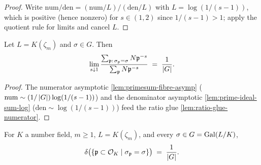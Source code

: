 \begin{proof}\leanok
  Write $\mathrm{num}/\mathrm{den} = (\mathrm{num}/L)/(\mathrm{den}/L)$
  with $L = \log(1/(s-1))$, which is positive (hence nonzero) for
  $s\in(1,2)$ since $1/(s-1) > 1$; apply the quotient rule for limits
  and cancel $L$.
\end{proof}

\begin{lemma}\label{lem:cyclotomic-density-two-sided}
  Let $L = K(\zeta_m)$ and $\sigma \in G$. Then
  \[
    \lim_{s\downarrow 1}
    \frac{\sum_{\mathfrak{p}:\,\sigma_{\mathfrak{p}} = \sigma} N\mathfrak{p}^{-s}}
         {\sum_{\mathfrak{p}} N\mathfrak{p}^{-s}}
    \;=\; \frac{1}{\left\lvert G \right\rvert}.
  \]
\end{lemma}

\begin{proof}
  \leanok
  The numerator asymptotic \cref{lem:primesum-fibre-asymp}
  ($\mathrm{num}\sim(1/\left\lvert G \right\rvert)\log(1/(s-1))$) and the denominator
  asymptotic \cref{lem:prime-ideal-sum-log}
  ($\mathrm{den}\sim\log(1/(s-1))$) feed the ratio glue
  \cref{lem:ratio-glue-numerator}.
\end{proof}

\begin{theorem}\label{thm:chebotarev-cyclotomic}
  For $K$ a number field, $m\ge 1$, $L=K(\zeta_m)$, and every
  $\sigma \in G = \mathrm{Gal}(L/K)$,
  \[
    \delta\bigl(\left\{ \mathfrak{p}\subset\mathcal{O}_K \;\middle|\; \sigma_{\mathfrak{p}} = \sigma \right\}\bigr)
    \;=\; \frac{1}{\left\lvert G \right\rvert}.
  \]
\end{theorem}
